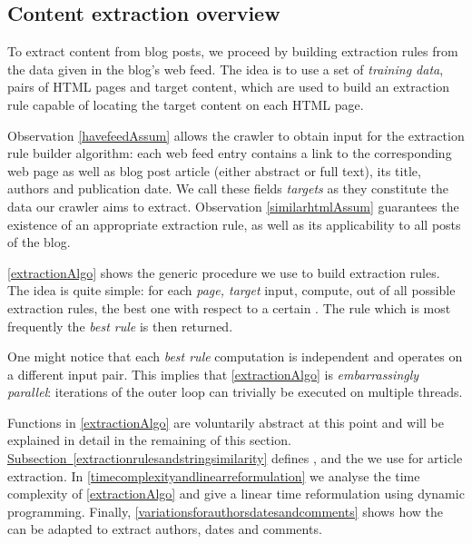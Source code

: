 \subsection{Content extraction overview}
\label{contentextraction}

To extract content from blog posts, we proceed by building extraction rules from the data given in the blog's web feed. The idea is to use a set of \emph{training data}, pairs of HTML pages and target content, which are used to build an extraction rule capable of locating the target content on each HTML page.

Observation \ref{havefeedAssum} allows the crawler to obtain input for the extraction rule builder algorithm: each web feed entry contains a link to the corresponding web page as well as blog post article (either abstract or full text), its title, authors and publication date. We call these fields \emph{targets} as they constitute the data our crawler aims to extract. Observation \ref{similarhtmlAssum} guarantees the existence of an appropriate extraction rule, as well as its applicability to all posts of the blog.

\autoref{extractionAlgo} shows the generic procedure we use to build extraction rules. The idea is quite simple: for each \code{(}\emph{page, target}\code{)} input, compute, out of all possible extraction rules, the best one with respect to a certain . The rule which is most frequently the \emph{best rule} is then returned.

\extractionAlgo

One might notice that each \emph{best rule} computation is independent and operates on a different input pair. This implies that \autoref{extractionAlgo} is \emph{embarrassingly parallel}: iterations of the outer loop can trivially be executed on multiple threads.

Functions in \autoref{extractionAlgo} are voluntarily abstract at this point and will be explained in detail in the remaining of this section.
\hyperref[extractionrulesandstringsimilarity]{Subsection~\ref*{extractionrulesandstringsimilarity}} %
defines ,  and the  we use for article extraction. In \autoref{timecomplexityandlinearreformulation} we analyse the time complexity of \autoref{extractionAlgo} and give a linear time reformulation using dynamic programming. Finally, \autoref{variationsforauthorsdatesandcomments} shows how the  can be adapted to extract authors, dates and comments.

